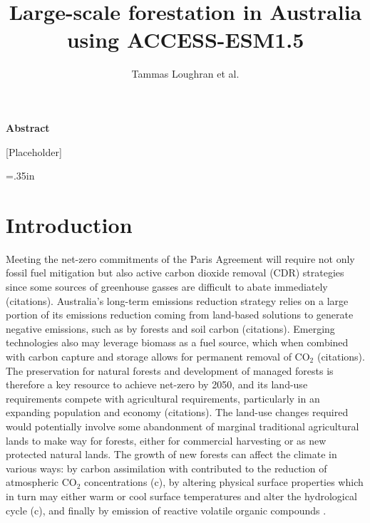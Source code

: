 \documentclass[]{article}
\title{Large-scale forestation in Australia using ACCESS-ESM1.5}
\author{Tammas Loughran et al.}
\begin{document}
\maketitle

\begin{center}
    \Large
    \vspace{0.9cm}
    \textbf{Abstract}
\end{center}

[Placeholder]

\raggedright
\parindent=.35in %

\section{Introduction}

Meeting the net-zero commitments of the Paris Agreement will require not only fossil fuel mitigation but also active carbon dioxide removal (CDR) strategies since some sources of greenhouse gasses are difficult to abate immediately (citations).
Australia's long-term emissions reduction strategy relies on a large portion of its emissions reduction coming from land-based solutions to generate negative emissions, such as by forests and soil carbon (citations).
Emerging technologies also may leverage biomass as a fuel source, which when combined with carbon capture and storage allows for permanent removal of CO$_2$ (citations).
The preservation for natural forests and development of managed forests is therefore a key resource to achieve net-zero by 2050, and its land-use requirements compete with agricultural requirements, particularly in an expanding population and economy (citations).
The land-use changes required would potentially involve some abandonment of marginal traditional agricultural lands to make way for forests, either for commercial harvesting or as new protected natural lands.
The growth of new forests can affect the climate in various ways: by carbon assimilation with contributed to the reduction of atmospheric CO$_2$ concentrations (c), by altering physical surface properties which in turn may either warm or cool surface temperatures and alter the hydrological cycle (c), and finally by emission of reactive volatile organic compounds \parencite{weber_chemistry_albedo_2024}.


\end{document}
